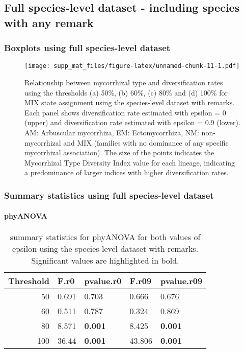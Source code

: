 \documentclass[]{article}
\let\oldparagraph\paragraph
\renewcommand{\paragraph}[1]{\oldparagraph{#1}\mbox{}}
\begin{document}
\hypertarget{full-species-level-dataset---including-species-with-any-remark}{%
\subsection{Full species-level dataset - including species with any
remark}\label{full-species-level-dataset---including-species-with-any-remark}}

\hypertarget{boxplots-using-full-species-level-dataset}{%
\subsubsection{Boxplots using full species-level
dataset}\label{boxplots-using-full-species-level-dataset}}

\begin{figure}
\centering
\texttt{[image: supp\_mat\_files/figure-latex/unnamed-chunk-11-1.pdf]}
\caption{Relationship between mycorrhizal type and diversification rates
using the thresholds (a) 50\%, (b) 60\%, (c) 80\% and (d) 100\% for MIX
state assignment using the species-level dataset with remarks. Each
panel shows diversification rate estimated with epsilon = 0 (upper) and
diversification rate estimated with epsilon = 0.9 (lower). AM:
Arbuscular mycorrhiza, EM: Ectomycorrhiza, NM: non-mycorrhizal and MIX
(families with no dominance of any specific mycorrhizal association).
The size of the points indicates the Mycorrhizal Type Diversity Index
value for each lineage, indicating a predominance of larger indices with
higher diversification rates.}
\end{figure}

\hypertarget{summary-statistics-using-full-species-level-dataset}{%
\subsubsection{Summary statistics using full species-level
dataset}\label{summary-statistics-using-full-species-level-dataset}}

\hypertarget{phyanova-2}{%
\paragraph{phyANOVA}\label{phyanova-2}}

\begin{table}[H]

\caption{\label{tab:unnamed-chunk-12}summary statistics for phyANOVA for both values of epsilon using the species-level dataset with remarks. Significant values are highlighted in bold.}
\centering
\begin{tabular}{r|l|l|l|l}
\hline
Threshold & F.r0 & pvalue.r0 & F.r09 & pvalue.r09\\
\hline
50 & 0.691 & 0.703 & 0.666 & 0.676\\
\hline
60 & 0.511 & 0.787 & 0.324 & 0.869\\
\hline
80 & 8.571 & \textbf{0.001} & 8.425 & \textbf{0.001}\\
\hline
100 & 36.44 & \textbf{0.001} & 43.806 & \textbf{0.001}\\
\hline
\end{tabular}
\end{table}
\end{document}
